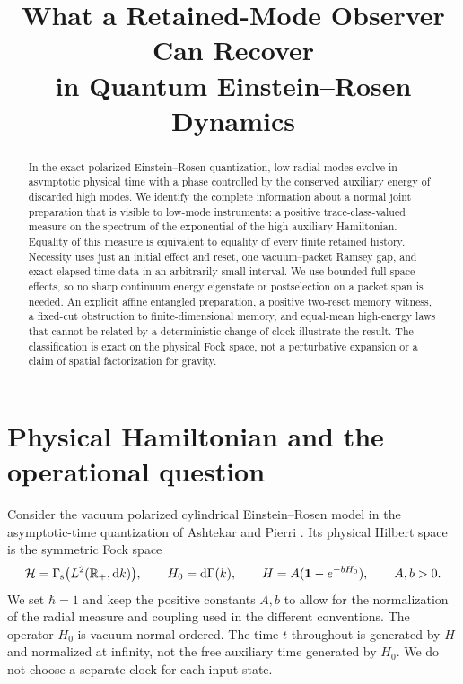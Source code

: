 \documentclass[11pt]{article}
\title{What a Retained-Mode Observer Can Recover\\ in Quantum Einstein--Rosen Dynamics}
\author{}
\date{}
\newcommand{\cH}{\mathcal H}
\newcommand{\dd}{\mathrm d}
\newcommand{\one}{\mathbf 1}
\begin{document}
\maketitle

\begin{abstract}
In the exact polarized Einstein--Rosen quantization, low radial modes evolve in asymptotic physical time with a phase controlled by the conserved auxiliary energy of discarded high modes. We identify the complete information about a normal joint preparation that is visible to low-mode instruments: a positive trace-class-valued measure on the spectrum of the exponential of the high auxiliary Hamiltonian. Equality of this measure is equivalent to equality of every finite retained history. Necessity uses just an initial effect and reset, one vacuum--packet Ramsey gap, and exact elapsed-time data in an arbitrarily small interval. We use bounded full-space effects, so no sharp continuum energy eigenstate or postselection on a packet span is needed. An explicit affine entangled preparation, a positive two-reset memory witness, a fixed-cut obstruction to finite-dimensional memory, and equal-mean high-energy laws that cannot be related by a deterministic change of clock illustrate the result. The classification is exact on the physical Fock space, not a perturbative expansion or a claim of spatial factorization for gravity.
\end{abstract}

\section{Physical Hamiltonian and the operational question}

Consider the vacuum polarized cylindrical Einstein--Rosen model in the asymptotic-time quantization of Ashtekar and Pierri \cite[\S4.2, Eq.~(37)]{AP}. Its physical Hilbert space is the symmetric Fock space
\[
  \cH=\Gamma_{\rm s}\bigl(L^2(\mathbb R_+,\dd k)\bigr),\qquad
  H_0=\dd\Gamma(k),\qquad
  H=A(\one-e^{-bH_0}),\qquad A,b>0 .
\]
We set \(\hbar=1\) and keep the positive constants \(A,b\) to allow for the normalization of the radial measure and coupling used in the different conventions. The operator \(H_0\) is vacuum-normal-ordered. The time \(t\) throughout is generated by \(H\) and normalized at infinity, not the free auxiliary time generated by \(H_0\). We do not choose a separate clock for each input state.
\end{document}
